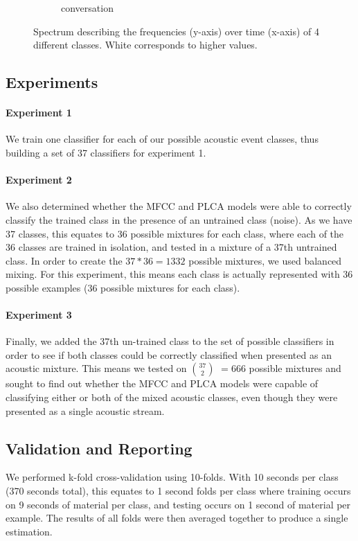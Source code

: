 \documentclass[a4paper,10pt,final]{ThesisStyle}
\begin{document}
\begin{figure}
\begin{subfigure}[b]{0.25\textwidth}
                \caption{conversation}
        \end{subfigure}%
        \caption{Spectrum describing the frequencies (y-axis) over time (x-axis) of 4 different classes.  White corresponds to higher values.}
\end{figure}


\subsection{Experiments}

\paragraph{Experiment 1}
We train one classifier for each of our possible acoustic event classes, thus building a set of 37 classifiers for experiment 1.

\paragraph{Experiment 2}
We also determined whether the MFCC and PLCA models were able to correctly classify the trained class in the presence of an untrained class (noise).  As we have 37 classes, this equates to 36 possible mixtures for each class, where each of the 36 classes are trained in isolation, and tested in a mixture of a 37th untrained class.  In order to create the $37*36 = 1332$ possible mixtures, we used balanced mixing.  For this experiment, this means each class is actually represented with 36 possible examples (36 possible mixtures for each class).  

\paragraph{Experiment 3}
Finally, we added the 37th un-trained class to the set of possible classifiers in order to see if both classes could be correctly classified when presented as an acoustic mixture.  This means we tested on $37\choose2$ $= 666$ possible mixtures and sought to find out whether the MFCC and PLCA models were capable of classifying either or both of the mixed acoustic classes, even though they were presented as a single acoustic stream.

\subsection{Validation and Reporting}
\label{sec:ROC}
We performed k-fold cross-validation using 10-folds.  With 10 seconds per class (370 seconds total), this equates to 1 second folds per class where training occurs on 9 seconds of material per class, and testing occurs on 1 second of material per example. The results of all folds were then averaged together to produce a single estimation.
\end{document}
